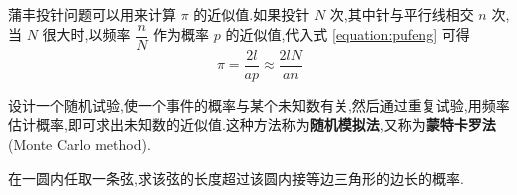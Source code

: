 \begin{solution}
\begin{figure}[H]
\begin{minipage}[b]{0.48\linewidth}
            \caption{}
            \label{fig:pufeng:1}
        \end{minipage}
        \hfill
        \begin{minipage}[b]{0.48\linewidth}
            \centering
    
            
            \caption{}
            \label{fig:pufeng:2}
        \end{minipage}
    \end{figure}
\end{solution}

\begin{note}
    \indent 蒲丰投针问题可以用来计算 $\pi$ 的近似值.如果投针 $N$ 次,其中针与平行线相交 $n$ 次,当 $N$ 很大时,以频率 $\dfrac{n}{N}$ 作为概率 $p$ 的近似值,代入式 \eqref{equation:pufeng} 可得
    $$
    \pi = \dfrac{2l}{ap} \approx \dfrac{2lN}{an}
    $$

    设计一个随机试验,使一个事件的概率与某个未知数有关,然后通过重复试验,用频率估计概率,即可求出未知数的近似值.这种方法称为\textbf{随机模拟法},又称为\textbf{蒙特卡罗法}(Monte Carlo method).
\end{note}

\begin{example}[][贝特朗奇论]
    \indent 在一圆内任取一条弦,求该弦的长度超过该圆内接等边三角形的边长的概率.
\end{example}

